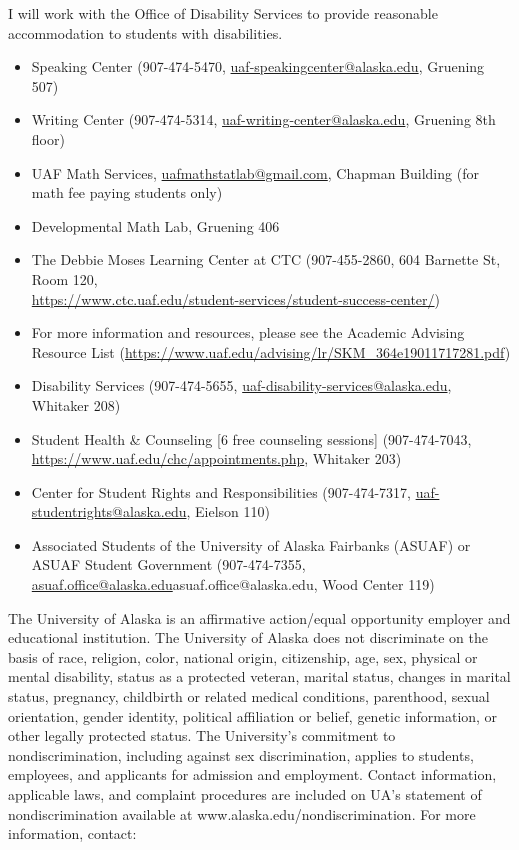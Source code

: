 \documentclass[12pt]{article}
\def\mailto#1{\href{mailto:#1}{#1}}
\begin{document}
 I will work with the Office of Disability Services to provide reasonable accommodation to students with disabilities.

\begin{itemize}
\setlength\itemsep{0em}
        \item Speaking Center (907-474-5470,
        \mailto{uaf-speakingcenter@alaska.edu}, Gruening 507)
\item Writing Center (907-474-5314, \mailto{uaf-writing-center@alaska.edu}, Gruening 8th floor)
\item UAF Math Services, \mailto{uafmathstatlab@gmail.com}, Chapman Building (for math fee paying students only)
\item Developmental Math Lab, Gruening 406
\item The Debbie Moses Learning Center at CTC (907-455-2860, 604 Barnette St, Room 120,\\ \mailto{https://www.ctc.uaf.edu/student-services/student-success-center/})
\item For more information and resources, please see the Academic Advising Resource List (\url{https://www.uaf.edu/advising/lr/SKM_364e19011717281.pdf})
\end{itemize}

\begin{itemize}
\setlength\itemsep{0em}
\item Disability Services (907-474-5655, \mailto{uaf-disability-services@alaska.edu}, Whitaker 208)
\item Student Health \& Counseling [6 free counseling sessions] (907-474-7043, \url{https://www.uaf.edu/chc/appointments.php}, Whitaker 203)
\item Center for Student Rights and Responsibilities (907-474-7317, \mailto{uaf-studentrights@alaska.edu}, Eielson 110)
\item Associated Students of the University of Alaska Fairbanks (ASUAF) or ASUAF Student Government (907-474-7355, \mailto{asuaf.office@alaska.edu}{asuaf.office@alaska.edu}, Wood Center 119)
\end{itemize}

The University of Alaska is an affirmative action/equal opportunity employer and educational institution. The University of Alaska does not discriminate on the basis of race, religion, color, national origin, citizenship, age, sex, physical or mental disability, status as a protected veteran, marital status, changes in marital status, pregnancy, childbirth or related medical conditions, parenthood, sexual orientation, gender identity, political affiliation or belief, genetic information, or other legally protected status. The University's commitment to nondiscrimination, including against sex discrimination, applies to students, employees, and applicants for admission and employment. Contact information, applicable laws, and complaint procedures are included on UA's statement of nondiscrimination available at www.alaska.edu/nondiscrimination. For more information, contact:
\end{document}
